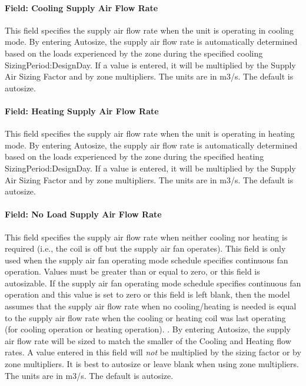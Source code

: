 \paragraph{Field: Cooling Supply Air Flow Rate}\label{field-cooling-supply-air-flow-rate-2}

This field specifies the supply air flow rate when the unit is operating in cooling mode. By entering Autosize, the supply air flow rate is automatically determined based on the loads experienced by the zone during the specified cooling SizingPeriod:DesignDay. If a value is entered, it will be multiplied by the Supply Air Sizing Factor and by zone multipliers. The units are in m3/s. The default is autosize.

\paragraph{Field: Heating Supply Air Flow Rate}\label{field-heating-supply-air-flow-rate-2}

This field specifies the supply air flow rate when the unit is operating in heating mode. By entering Autosize, the supply air flow rate is automatically determined based on the loads experienced by the zone during the specified heating SizingPeriod:DesignDay. If a value is entered, it will be multiplied by the Supply Air Sizing Factor and by zone multipliers. The units are in m3/s. The default is autosize.

\paragraph{Field: No Load Supply Air Flow Rate}\label{field-no-load-supply-air-flow-rate-2}

This field specifies the supply air flow rate when neither cooling nor heating is required (i.e., the coil is off but the supply air fan operates). This field is only used when the supply air fan operating mode schedule specifies continuous fan operation. Values must be greater than or equal to zero, or this field is autosizable. If the supply air fan operating mode schedule specifies continuous fan operation and this value is set to zero or this field is left blank, then the model assumes that the supply air flow rate when no cooling/heating is needed is equal to the supply air flow rate when the cooling or heating coil was last operating (for cooling operation or heating operation). . By entering Autosize, the supply air flow rate will be sized to match the smaller of the Cooling and Heating flow rates. A value entered in this field will \emph{not} be multiplied by the sizing factor or by zone multipliers. It is best to autosize or leave blank when using zone multipliers. The units are in m3/s. The default is autosize.

